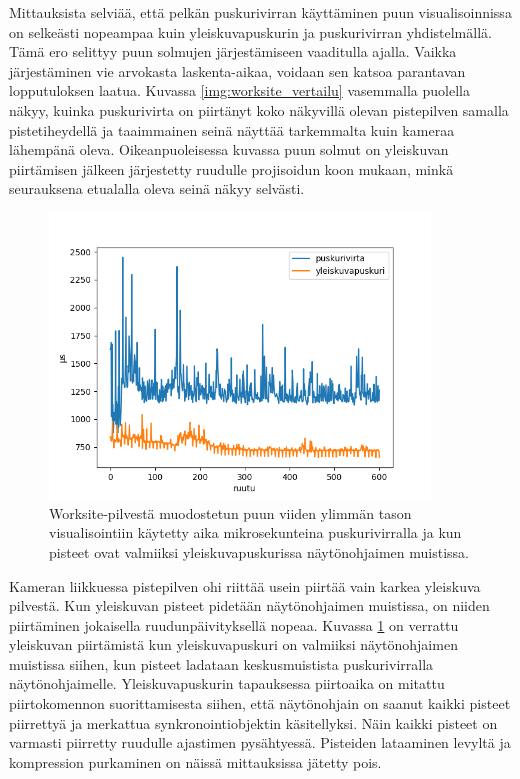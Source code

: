 Mittauksista selviää, että pelkän puskurivirran käyttäminen puun visualisoinnissa on selkeästi nopeampaa kuin yleiskuvapuskurin ja puskurivirran yhdistelmällä. Tämä ero selittyy puun solmujen järjestämiseen vaaditulla ajalla. Vaikka järjestäminen vie arvokasta laskenta-aikaa, voidaan sen katsoa parantavan lopputuloksen laatua. Kuvassa \ref{img:worksite_vertailu} vasemmalla puolella näkyy, kuinka puskurivirta on piirtänyt koko näkyvillä olevan pistepilven samalla pistetiheydellä ja taaimmainen seinä näyttää tarkemmalta kuin kameraa lähempänä oleva. Oikeanpuoleisessa kuvassa puun solmut on yleiskuvan piirtämisen jälkeen järjestetty ruudulle projisoidun koon mukaan, minkä seurauksena etualalla oleva seinä näkyy selvästi.

\begin{figure}[h]
    \centering
    \includegraphics[width=0.9\textwidth]{tuloksia/worksite_overview.png}
    \caption{Worksite-pilvestä muodostetun puun viiden ylimmän tason visualisointiin käytetty aika mikrosekunteina puskurivirralla ja kun pisteet ovat valmiiksi yleiskuvapuskurissa näytönohjaimen muistissa.}
    \label{ws_ovw}
\end{figure}

Kameran liikkuessa pistepilven ohi riittää usein piirtää vain karkea yleiskuva pilvestä. Kun yleiskuvan pisteet pidetään näytönohjaimen muistissa, on niiden piirtäminen jokaisella ruudunpäivityksellä nopeaa. Kuvassa \ref{ws_ovw} on verrattu yleiskuvan piirtämistä kun yleiskuvapuskuri on valmiiksi näytönohjaimen muistissa siihen, kun pisteet ladataan keskusmuistista puskurivirralla näytönohjaimelle. Yleiskuvapuskurin tapauksessa piirtoaika on mitattu piirtokomennon suorittamisesta siihen, että näytönohjain on saanut kaikki pisteet piirrettyä ja merkattua synkronointiobjektin käsitellyksi. Näin kaikki pisteet on varmasti piirretty ruudulle ajastimen pysähtyessä. Pisteiden lataaminen levyltä ja kompression purkaminen on näissä mittauksissa jätetty pois.